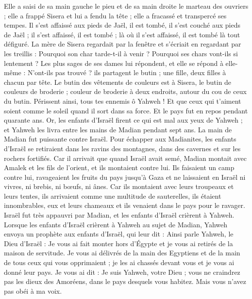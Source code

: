 \begin{multicols}{2}
Elle a saisi de sa main gauche le pieu et de sa main droite le marteau des ouvriers ; elle a frappé Sisera et lui a fendu la tête ; elle a fracassé et transpercé ses tempes.
Il s'est affaissé aux pieds de Jaël, il est tombé, il s'est couché aux pieds de Jaël ; il s'est affaissé, il est tombé ; là où il s'est affaissé, il est tombé là tout défiguré.
La mère de Sisera regardait par la fenêtre et s'écriait en regardant par les treillis : Pourquoi son char tarde-t-il à venir ? Pourquoi ses chars vont-ils si lentement ?
Les plus sages de ses dames lui répondent, et elle se répond à elle-même :
N'ont-ils pas trouvé ? ils partagent le butin ; une fille, deux filles à chacun par tête. Le butin des vêtements de couleurs est à Sisera, le butin de couleurs de broderie ; couleur de broderie à deux endroits, autour du cou de ceux du butin.
Périssent ainsi, tous tes ennemis ô Yahweh ! Et que ceux qui t'aiment soient comme le soleil quand il sort dans sa force. Et le pays fut en repos pendant quarante ans.
\VerseOne{}Or, les enfants d'Israël firent ce qui est mal aux yeux de Yahweh ; et Yahweh les livra entre les mains de Madian pendant sept ans.
La main de Madian fut puissante contre Israël. Pour échapper aux Madianites, les enfants d'Israël se retiraient dans les ravins des montagnes, dans des cavernes et sur les rochers fortifiés.
Car il arrivait que quand Israël avait semé, Madian montait avec Amalek et les fils de l'orient, et ils montaient contre lui.
Ils faisaient un camp contre lui, ravageaient les fruits du pays jusqu'à Gaza et ne laissaient en Israël ni vivres, ni brebis, ni bœufs, ni ânes.
Car ils montaient avec leurs troupeaux et leurs tentes, ils arrivaient comme une multitude de sauterelles, ils étaient innombrables, eux et leurs chameaux et ils venaient dans le pays pour le ravager.
Israël fut très appauvri par Madian, et les enfants d'Israël crièrent à Yahweh.
Lorsque les enfants d'Israël crièrent à Yahweh au sujet de Madian,
Yahweh envoya un prophète aux enfants d'Israël, qui leur dit : Ainsi parle Yahweh, le Dieu d'Israël : Je vous ai fait monter hors d'Égypte et je vous ai retirés de la maison de servitude.
Je vous ai délivrés de la main des Egyptiens et de la main de tous ceux qui vous opprimaient ; je les ai chassés devant vous et je vous ai donné leur pays.
Je vous ai dit : Je suis Yahweh, votre Dieu ; vous ne craindrez pas les dieux des Amoréens, dans le pays desquels vous habitez. Mais vous n'avez pas obéi à ma voix.

\end{multicols}
